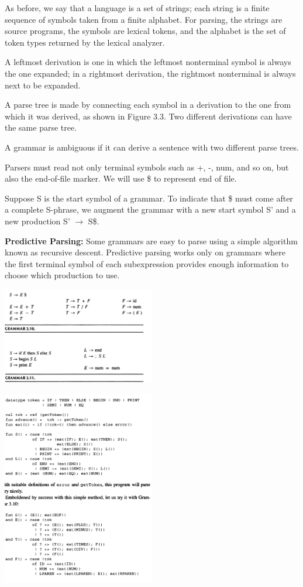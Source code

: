 \documentclass[8pt, a4paper, oneside, twocolumn]{extarticle}
\begin{document}
As before, we say that a language is a set of strings; each string is a finite
sequence of symbols taken from a finite alphabet. For parsing, the strings are
source programs, the symbols are lexical tokens, and the alphabet is the set
of token types returned by the lexical analyzer.

A leftmost
derivation is one in which the leftmost nonterminal symbol is always the one
expanded; in a rightmost derivation, the rightmost nonterminal is always next
to be expanded.

A parse tree is made by connecting each symbol in a derivation to the one
from which it was derived, as shown in Figure 3.3. Two different derivations
can have the same parse tree.

A grammar is ambiguous if it can derive a sentence with two different parse
trees.

Parsers must read not only terminal symbols such as +, -, num, and so on, but
also the end-of-file marker. We will use \$ to represent end of file.

Suppose S is the start symbol of a grammar. To indicate that \$ must come
after a complete S-phrase, we augment the grammar with a new start symbol
S' and a new production S' $\rightarrow$ S\$.

\textbf{Predictive Parsing:} Some grammars are easy to parse using a simple algorithm known as 
recursive descent. Predictive parsing works only on grammars where
the first terminal symbol of each subexpression provides enough information
to choose which production to use.

\includegraphics[width=0.5\textwidth,height=0.5\textheight,keepaspectratio]{pp}

\includegraphics[width=0.5\textwidth,height=0.5\textheight,keepaspectratio]{pp2}
\end{document}
